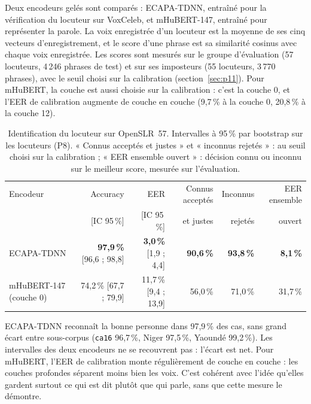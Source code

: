 Deux encodeurs gelés sont comparés : ECAPA-TDNN, entraîné pour la vérification du locuteur sur
VoxCeleb, et mHuBERT-147, entraîné pour représenter la parole. La voix enregistrée d'un
locuteur est la moyenne de ses cinq vecteurs d'enregistrement, et le score d'une phrase est sa
similarité cosinus avec chaque voix enregistrée. Les scores sont mesurés sur le groupe
d'évaluation (57 locuteurs, 4\,246 phrases de test) et sur ses imposteurs (55 locuteurs,
3\,770 phrases), avec le seuil choisi sur la calibration (section~\ref{sec:p11}). Pour mHuBERT,
la couche est aussi choisie sur la calibration : c'est la couche 0, et l'EER de calibration
augmente de couche en couche (9,7\,\% à la couche 0, 20,8\,\% à la couche 12).

\begin{table}[ht]
  \centering
  \small
  \begin{tabular}{@{}lrrrrr@{}}
    \toprule
    Encodeur & Accuracy & EER & Connus acceptés & Inconnus & EER ensemble \\
             & [IC 95\,\%] & [IC 95\,\%] & et justes & rejetés & ouvert \\
    \midrule
    ECAPA-TDNN & \textbf{97,9\,\%} [96,6 ; 98,8] & \textbf{3,0\,\%} [1,9 ; 4,4] & \textbf{90,6\,\%} & \textbf{93,8\,\%} & \textbf{8,1\,\%} \\
    mHuBERT-147 (couche 0) & 74,2\,\% [67,7 ; 79,9] & 11,7\,\% [9,4 ; 13,9] & 56,0\,\% & 71,0\,\% & 31,7\,\% \\
    \bottomrule
  \end{tabular}
  \caption{Identification du locuteur sur OpenSLR~57. Intervalles à 95\,\% par bootstrap sur
    les locuteurs (P8). « Connus acceptés et justes » et « inconnus rejetés » : au seuil choisi
    sur la calibration ; « EER ensemble ouvert » : décision connu ou inconnu sur le meilleur
    score, mesurée sur l'évaluation.}
  \label{tab:locuteur}
\end{table}

ECAPA-TDNN reconnaît la bonne personne dans 97,9\,\% des cas, sans grand écart entre
sous-corpus (\texttt{ca16} 96,7\,\%, Niger 97,5\,\%, Yaoundé 99,2\,\%). Les intervalles des deux
encodeurs ne se recouvrent pas : l'écart est net. Pour mHuBERT, l'EER de calibration monte
régulièrement de couche en couche : les couches profondes séparent moins bien les voix. C'est
cohérent avec l'idée qu'elles gardent surtout ce qui est dit plutôt que qui parle, sans que
cette mesure le démontre.

